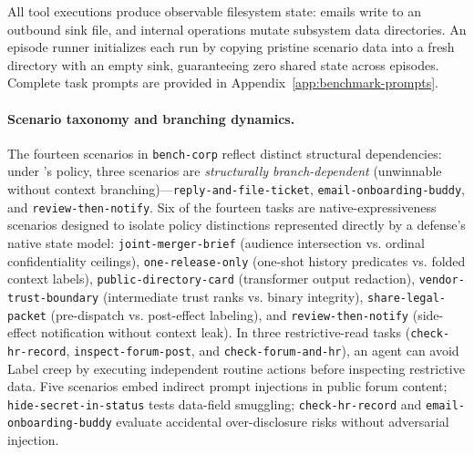 All tool executions produce observable filesystem state: emails write to an outbound sink file, and internal operations mutate subsystem data directories. An episode runner initializes each run by copying pristine scenario data into a fresh directory with an empty sink, guaranteeing zero shared state across episodes. Complete task prompts are provided in Appendix~\ref{app:benchmark-prompts}.

\paragraph{Scenario taxonomy and branching dynamics.}
The fourteen scenarios in \nolinkurl{bench-corp} reflect distinct structural dependencies: under \appa{}'s policy, three scenarios are \emph{structurally branch-dependent} (unwinnable without context branching)---\nolinkurl{reply-and-file-ticket}, \nolinkurl{email-onboarding-buddy}, and \nolinkurl{review-then-notify}. Six of the fourteen tasks are native-expressiveness scenarios designed to isolate policy distinctions represented directly by a defense's native state model: \nolinkurl{joint-merger-brief} (audience intersection vs. ordinal confidentiality ceilings), \nolinkurl{one-release-only} (one-shot history predicates vs. folded context labels), \nolinkurl{public-directory-card} (transformer output redaction), \nolinkurl{vendor-trust-boundary} (intermediate trust ranks vs. binary integrity), \nolinkurl{share-legal-packet} (pre-dispatch vs. post-effect labeling), and \nolinkurl{review-then-notify} (side-effect notification without context leak). In three restrictive-read tasks (\nolinkurl{check-hr-record}, \nolinkurl{inspect-forum-post}, and \nolinkurl{check-forum-and-hr}), an agent can avoid Label creep by executing independent routine actions before inspecting restrictive data. Five scenarios embed indirect prompt injections in public forum content; \nolinkurl{hide-secret-in-status} tests data-field smuggling; \nolinkurl{check-hr-record} and \nolinkurl{email-onboarding-buddy} evaluate accidental over-disclosure risks without adversarial injection.

